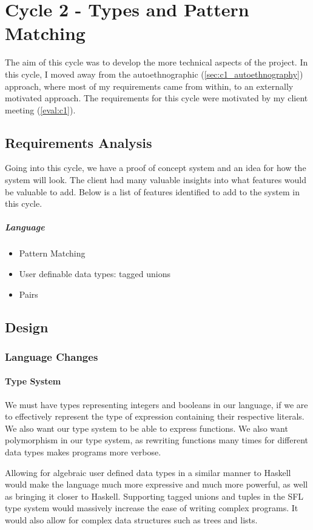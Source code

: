 \chapter{Cycle 2 - Types and Pattern Matching}
The aim of this cycle was to develop the more technical aspects of the project. In this cycle, I moved away from the autoethnographic (\ref{sec:c1_autoethnography}) approach, where most of my requirements came from within, to an externally motivated approach. The requirements for this cycle were motivated by my client meeting (\ref{eval:c1}). 

\section{Requirements Analysis}
Going into this cycle, we have a proof of concept system and an idea for how the system will look. 
The client had many valuable insights into what features would be valuable to add. Below is a list of features identified to add to the system in this cycle. 

\paragraph{Language}
\begin{itemize}
    \item Pattern Matching
    \item User definable data types: tagged unions
    \item Pairs
\end{itemize}

\section{Design}
\subsection{Language Changes}
\subsubsection{Type System}
We must have types representing integers and booleans in our language, if we are to effectively represent the type of expression containing their respective literals. We also want our type system to be able to express functions. We also want polymorphism in our type system, as rewriting functions many times for different data types makes programs more verbose. 

Allowing for algebraic user defined data types in a similar manner to Haskell would make the language much more expressive and much more powerful, as well as bringing it closer to Haskell. Supporting tagged unions and tuples in the \ac{SFL} type system would massively increase the ease of writing complex programs. It would also allow for complex data structures such as trees and lists. 

